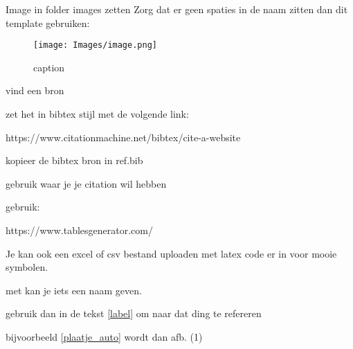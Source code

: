 
Image in folder images zetten
Zorg dat er geen spaties in de naam zitten
dan dit template gebruiken:

\begin{figure}[H]
    \centering
    \texttt{[image: Images/image.png]}
    \caption{caption}
    \label{fig:image}
\end{figure}



vind een bron

zet het in bibtex stijl met de volgende link:

https://www.citationmachine.net/bibtex/cite-a-website

kopieer de bibtex bron in ref.bib

gebruik \cite{name} waar je je citation wil hebben


gebruik:

https://www.tablesgenerator.com/

Je kan ook een excel of csv bestand uploaden met latex code er in voor mooie symbolen.




met \label{label} kan je iets een naam geven.

gebruik dan in de tekst \cref{label} om naar dat ding te refereren

bijvoorbeeld \cref{plaatje_auto} wordt dan afb. (1)


